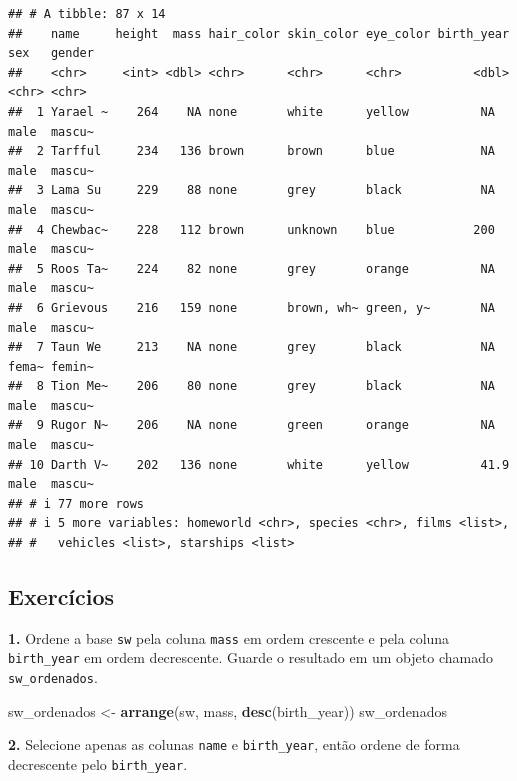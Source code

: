 \documentclass[
]{book}
\newenvironment{Shaded}{\begin{snugshade}}{\end{snugshade}}
\newcommand{\FunctionTok}[1]{\textcolor[rgb]{0.13,0.29,0.53}{\textbf{#1}}}
\newcommand{\NormalTok}[1]{#1}
\newcommand{\OtherTok}[1]{\textcolor[rgb]{0.56,0.35,0.01}{#1}}
\begin{document}
\begin{verbatim}
## # A tibble: 87 x 14
##    name     height  mass hair_color skin_color eye_color birth_year sex   gender
##    <chr>     <int> <dbl> <chr>      <chr>      <chr>          <dbl> <chr> <chr> 
##  1 Yarael ~    264    NA none       white      yellow          NA   male  mascu~
##  2 Tarfful     234   136 brown      brown      blue            NA   male  mascu~
##  3 Lama Su     229    88 none       grey       black           NA   male  mascu~
##  4 Chewbac~    228   112 brown      unknown    blue           200   male  mascu~
##  5 Roos Ta~    224    82 none       grey       orange          NA   male  mascu~
##  6 Grievous    216   159 none       brown, wh~ green, y~       NA   male  mascu~
##  7 Taun We     213    NA none       grey       black           NA   fema~ femin~
##  8 Tion Me~    206    80 none       grey       black           NA   male  mascu~
##  9 Rugor N~    206    NA none       green      orange          NA   male  mascu~
## 10 Darth V~    202   136 none       white      yellow          41.9 male  mascu~
## # i 77 more rows
## # i 5 more variables: homeworld <chr>, species <chr>, films <list>,
## #   vehicles <list>, starships <list>
\end{verbatim}

\subsection{Exercícios}\label{exercuxedcios-16}

\textbf{1.} Ordene a base \texttt{sw} pela coluna \texttt{mass} em ordem crescente e pela
coluna \texttt{birth\_year} em ordem decrescente. Guarde o resultado em um
objeto chamado \texttt{sw\_ordenados}.

\begin{Shaded}
\begin{Highlighting}[]
\NormalTok{sw\_ordenados }\OtherTok{\textless{}{-}} \FunctionTok{arrange}\NormalTok{(sw, mass, }\FunctionTok{desc}\NormalTok{(birth\_year))}
\NormalTok{sw\_ordenados}
\end{Highlighting}
\end{Shaded}

\textbf{2.} Selecione apenas as colunas \texttt{name} e \texttt{birth\_year}, então ordene
de forma decrescente pelo \texttt{birth\_year}.
\end{document}
